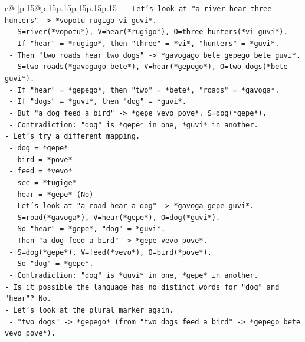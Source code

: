 \documentclass{article}
\begin{document}
{\begin{supertabular}{c@{$\;$}|p{.15\linewidth}@{}p{.15\linewidth}p{.15\linewidth}p{.15\linewidth}p{.15\linewidth}p{.15\linewidth}}
{{{\texttt{  {-} Let's look at "a river hear three hunters" {-}> *vopotu rugigo vi guvi*.} \\
\texttt{    {-} S=river(*vopotu*), V=hear(*rugigo*), O=three hunters(*vi guvi*).} \\
\texttt{    {-} If "hear" = *rugigo*, then "three" = *vi*, "hunters" = *guvi*.} \\
\texttt{    {-} Then "two roads hear two dogs" {-}> *gavogago bete gepego bete guvi*.} \\
\texttt{      {-} S=two roads(*gavogago bete*), V=hear(*gepego*), O=two dogs(*bete guvi*).} \\
\texttt{      {-} If "hear" = *gepego*, then "two" = *bete*, "roads" = *gavoga*.} \\
\texttt{      {-} If "dogs" = *guvi*, then "dog" = *guvi*.} \\
\texttt{      {-} But "a dog feed a bird" {-}> *gepe vevo pove*. S=dog(*gepe*).} \\
\texttt{      {-} Contradiction: "dog" is *gepe* in one, *guvi* in another.} \\
\texttt{{-} Let's try a different mapping.} \\
\texttt{  {-} dog = *gepe*} \\
\texttt{  {-} bird = *pove*} \\
\texttt{  {-} feed = *vevo*} \\
\texttt{  {-} see = *tugige*} \\
\texttt{  {-} hear = *gepe* (No)} \\
\texttt{  {-} Let's look at "a road hear a dog" {-}> *gavoga gepe guvi*.} \\
\texttt{    {-} S=road(*gavoga*), V=hear(*gepe*), O=dog(*guvi*).} \\
\texttt{    {-} So "hear" = *gepe*, "dog" = *guvi*.} \\
\texttt{  {-} Then "a dog feed a bird" {-}> *gepe vevo pove*.} \\
\texttt{    {-} S=dog(*gepe*), V=feed(*vevo*), O=bird(*pove*).} \\
\texttt{    {-} So "dog" = *gepe*.} \\
\texttt{  {-} Contradiction: "dog" is *guvi* in one, *gepe* in another.} \\
\texttt{{-} Is it possible the language has no distinct words for "dog" and "hear"? No.} \\
\texttt{{-} Let's look at the plural marker again.} \\
\texttt{  {-} "two dogs" {-}> *gepego* (from "two dogs feed a bird" {-}> *gepego bete vevo pove*).} \\
}}}
\end{supertabular}}
\end{document}
